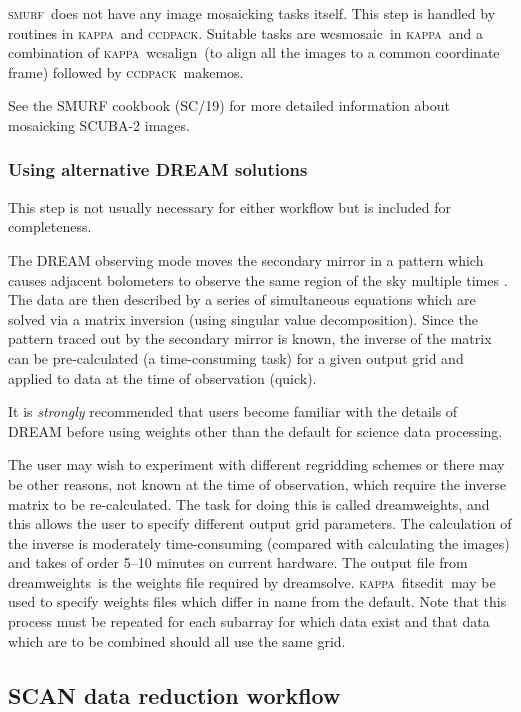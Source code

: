 \documentclass[twoside,11pt]{article}
\newcommand{\xref}[3]{#1}
\newcommand{\xlabel}[1]{}
\renewcommand{\_}{\texttt{\symbol{95}}}
\newcommand{\CCDPACK}{\textsc{ccdpack}}
\newcommand{\KAPPA}{\textsc{kappa}}
\newcommand{\SMURF}{\textsc{smurf}}
\newcommand{\SMURFcook}{\xref{SC/19}{sc19}{}}
\newcommand{\task}[1]{\textsf{#1}}
\newcommand{\dreamsolve}{\xref{\task{dreamsolve}}{sun258}{DREAMSOLVE}}
\newcommand{\dreamweights}{\xref{\task{dreamweights}}{sun258}{DREAMWEIGHTS}}
\newcommand{\makemos}{\xref{\task{makemos}}{sun139}{MAKEMOS}}
\newcommand{\fitsedit}{\xref{\task{fitsedit}}{sun95}{FITSEDIT}}
\newcommand{\wcsmosaic}{\xref{\task{wcsmosaic}}{sun95}{WCSMOSAIC}}
\newcommand{\wcsalign}{\xref{\task{wcsalign}}{sun95}{WCSALIGN}}
\begin{document}
\SMURF\ does not have any image mosaicking tasks itself. This step is
handled by routines in \KAPPA\ and \CCDPACK. Suitable tasks are
\wcsmosaic\ in \KAPPA\ and a combination of \KAPPA\ \wcsalign\ (to
align all the images to a common coordinate frame) followed by
\CCDPACK\ \makemos.

See the SMURF cookbook (\SMURFcook) for more detailed information
about mosaicking SCUBA-2 images.

\subsubsection{\xlabel{dream}Using alternative DREAM solutions\label{se:dream}}

This step is not usually necessary for either workflow but is included
for completeness.

The DREAM observing mode moves the secondary mirror in a pattern which
causes adjacent bolometers to observe the same region of the sky
multiple times \cite{scuba2,dream}. The data are then described by a
series of simultaneous equations which are solved via a matrix
inversion (using singular value decomposition). Since the pattern
traced out by the secondary mirror is known, the inverse of the matrix
can be pre-calculated (a time-consuming task) for a given output grid
and applied to data at the time of observation (quick).

It is {\em strongly} recommended that users become familiar with the
details of DREAM \cite{dream} before using weights other than the
default for science data processing.

The user may wish to experiment with different regridding schemes or
there may be other reasons, not known at the time of observation,
which require the inverse matrix to be re-calculated. The task for
doing this is called \dreamweights, and this allows the user to
specify different output grid parameters. The calculation of the
inverse is moderately time-consuming (compared with calculating the
images) and takes of order 5--10 minutes on current hardware. The
output file from \dreamweights\ is the weights file required by
\dreamsolve. \KAPPA\ \fitsedit\ may be used to specify weights files
which differ in name from the default. Note that this process must be
repeated for each subarray for which data exist and that data which
are to be combined should all use the same grid.

\subsection{\xlabel{scanworkflow}SCAN data reduction
  workflow\label{se:scanworkflow}}
\end{document}
